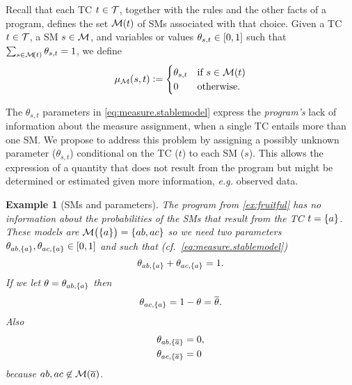 \documentclass[a4paper]{article}
\newtheorem{example}{Example}
\newtheorem{example}{Example}
\newcommand{\at}[1]{\ensuremath{\!\del{#1}}}        %
\newcommand{\cla}[1]{\ensuremath{{\cal #1}}}        %
\newcommand{\co}[1]{\ensuremath{\overline{#1}}}     %
\newcommand{\TCHOICEset}{\ensuremath{\cla{T}}}
\newcommand{\MODELset}{\ensuremath{\cla{M}}}
\newcommand{\pwM}{\ensuremath{\mu_{\MODELset}}}
\newcommand{\pwm}[1]{\ensuremath{\pwM\at{#1}}}
\newcommand{\tcgen}[1]{\MODELset\at{#1}}
\newcommand{\franc}[1]{{\color{green!30!black}#1}}
\begin{document}
Recall that each \acl{TC} \(t \in \TCHOICEset\), together with the
rules and the other facts of a program, defines the set \tcgen{t} of
\aclp{SM} associated with that choice.  Given a \acl{TC}
\(t \in \TCHOICEset\), a \acl{SM} \(s \in \MODELset \), and variables
or values \(\theta_{s,t} \in \intcc{0, 1}\) such that
\(\sum_{s\in \tcgen{t}} \theta_{s,t} = 1\), we define
\begin{equation}
    \pwm{s, t} := \begin{cases}
        \theta_{s,t} & \text{if~} s \in \tcgen{t}\cr 0 & \text{otherwise.}
    \end{cases}
    \label{eq:measure.stablemodel}
\end{equation}

The \(\theta_{s,t}\) parameters in \cref{eq:measure.stablemodel}
express the \emph{program's} lack of information about the measure
assignment, when a single \acl{TC} entails more than one \acl{SM}.  We
propose to address this problem by assigning a possibly unknown
parameter (\(\theta_{s,t}\)) conditional on the \acl{TC} (\(t\)) to
each \acl{SM} (\(s\)).  This allows the expression of a quantity that
does not result from the program but might be determined or estimated
given more information, \textit{e.g.} observed data.

\franc{
    \begin{example}[\Aclp{SM} and parameters]%
      \label{ex:models.parameters}%
      \em %
      The program from \cref{ex:fruitful} has no information about the
      probabilities of the \aclp{SM} that result from the \acl{TC}
      \(t = \set{a}\).  These models are
      \(\MODELset\at{\set{a}} = \set{ab, ac}\) so we need two
      parameters
      \(\theta_{ab, \set{a}}, \theta_{ac, \set{a}} \in \intcc{0,1}\)
      and such that (\textit{cf.}\ \cref{eq:measure.stablemodel})
        \begin{equation*}
            \theta_{ab, \set{a}} + \theta_{ac, \set{a}} = 1.
        \end{equation*}
        If we let \(\theta = \theta_{ab, \set{a}}\) then
        \begin{equation*}
            \theta_{ac, \set{a}} = 1 - \theta = \co{\theta}.
        \end{equation*}
        Also
        \begin{equation*}
            \begin{split}
                \theta_{ab, \set{\co{a}}} &= 0,\\
                \theta_{ac, \set{\co{a}}} &= 0
            \end{split}
        \end{equation*}
        because \(ab, ac \not\in\MODELset\at{\co{a}}\).
    \end{example}
}
\end{document}
